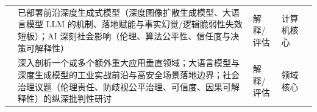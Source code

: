 \begin{tabularx}{\textwidth}{>{\raggedright\arraybackslash}p{} Y >{\centering\arraybackslash}p{0.15\textwidth} >{\centering\arraybackslash}p{0.09\textwidth} >{\centering\arraybackslash}p{0.06\textwidth}}
& 已部署前沿深度生成式模型（深度图像扩散生成模型、大语言模型 LLM 的机制、落地赋能与事实幻觉/逻辑脆弱性失效短板）；AI 深刻社会影响（伦理、算法公平性、信任度与决策可解释性） & 解释/评估 & 计算机核心 & \\
& 深入剖析一个或多个额外重大应用垂直领域；大语言模型与深度生成模型的工业实战前沿与高安全场景落地边界；社会治理议题（伦理责任、防歧视公平治理、可信度、因果可解释性）的纵深批判性研讨 & 解释/评估 & 领域核心 & 2 \\
\bottomrule
\end{tabularx}
\endgroup
\clearpage
\twocolumn
